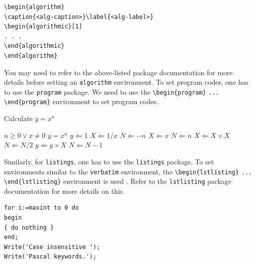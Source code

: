 \documentclass[12pt,a4paper]{article}
\begin{document}
\begin{verbatim}
\begin{algorithm}
\caption{<alg-caption>}\label{<alg-label>}
\begin{algorithmic}[1]
. . .
\end{algorithmic}
\end{algorithm}
\end{verbatim}

You may need to refer to the above-listed package documentation for more details before setting an \verb+algorithm+ environment.
To set program codes, one has to use the \verb+program+ package. We need to use the \verb+\begin{program}+ \verb+...+
\verb+\end{program}+ environment to set program codes.

\begin{algorithm}[!ht]
\caption{Calculate $y = x^n$}\label{algo1}
\begin{algorithmic}[1]
\Require $n \geq 0 \vee x \neq 0$
\Ensure $y = x^n$
\State $y \Leftarrow 1$
        \State $X \Leftarrow 1 / x$
        \State $N \Leftarrow -n$
\Else
        \State $X \Leftarrow x$
        \State $N \Leftarrow n$
\EndIf
{}
            \State $X \Leftarrow X \times X$
            \State $N \Leftarrow N / 2$
        \Else[$N$ is odd]
            \State $y \Leftarrow y \times X$
            \State $N \Leftarrow N - 1$
        \EndIf
\EndWhile
\end{algorithmic}
\end{algorithm}

Similarly, for \verb+listings+, one has to use the \verb+listings+ package. To set environments similar to the \verb+verbatim+ environment, the \verb+\begin{lstlisting}+ \verb+... + \verb+\end{lstlisting}+ environment is used . Refer to the \verb+lstlisting+ package documentation for more details on this.

\begin{minipage}{\hsize}%
\lstset{language=Pascal}%
\begin{lstlisting}[frame=single,framexleftmargin=-1pt,framexrightmargin=-17pt,framesep=12pt,linewidth=0.95\textwidth]
for i:=maxint to 0 do
begin
{ do nothing }
end;
Write('Case insensitive ');
Write('Pascal keywords.');
\end{lstlisting}
\end{minipage}
\end{document}
